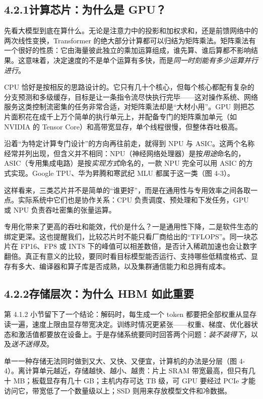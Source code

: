 \subsection*{4.2.1\quad 计算芯片：为什么是 GPU？}

先看大模型到底在算什么。无论是注意力中的投影和加权求和，还是前馈网络中的两次线性变换，Transformer 的绝大部分计算都可以归结为矩阵乘法。矩阵乘法有一个很好的性质：它由海量彼此独立的乘加运算组成，谁先算、谁后算都不影响结果。这意味着，决定速度的不是单个运算有多快，而是\emph{同一时刻能有多少运算并行进行}。

CPU 恰好是按相反的思路设计的。它只有几十个核心，但每个核心都配有复杂的分支预测和多级缓存，目标是让一条指令流尽快执行完毕——这对操作系统、网络服务这类控制流密集的任务非常合适，对矩阵乘法却是“大材小用”。GPU 则把芯片面积花在成千上万个简单的执行单元上，并配备专门的矩阵乘加单元（如 NVIDIA 的 Tensor Core）和高带宽显存，单个线程很慢，但整体吞吐极高。

沿着“为特定计算专门设计”的方向再往前走，就得到 NPU 与 ASIC。这两个名称经常并列出现，但含义并不相同：NPU（神经网络处理器）是按\emph{用途}命名的，ASIC（专用集成电路）是按\emph{实现方式}命名的，一款 NPU 完全可以用 ASIC 的方式实现。Google TPU、华为昇腾和寒武纪 MLU 都属于这一类（图 4-3）。

这样看来，三类芯片并不是简单的“谁更好”，而是在通用性与专用效率之间各取一点。实际系统中它们也是协作关系：CPU 负责调度、预处理和下发任务，GPU 或 NPU 负责吞吐密集的张量运算。

专用化带来了更高的吞吐和能效，代价是什么？一是通用性下降，二是软件生态的绑定更深。这也提醒我们，比较芯片时不能只看厂商给出的“TFLOPS”。同一块芯片在 FP16、FP8 或 INT8 下的峰值可以相差数倍，是否计入稀疏加速也会让数字翻倍。真正有意义的比较，要同时看目标模型能否运行、支持哪些低精度格式、显存有多大、编译器和算子库是否成熟，以及集群通信能力和总拥有成本。

\subsection*{4.2.2\quad 存储层次：为什么 HBM 如此重要}

第 4.1.2 小节留下了一个结论：解码时，每生成一个 token 都要把全部权重从显存读一遍，速度上限由显存带宽决定。训练时情况更紧张——权重、梯度、优化器状态和激活值都要放在设备上。于是存储系统要同时回答两个问题：\emph{装不装得下}，以及\emph{送不送得及}。

单一一种存储无法同时做到又大、又快、又便宜，计算机的办法是分层（图 4-4）。离计算单元越近，存储越快、越小、越贵：片上 SRAM 带宽最高，但只有几十 MB；板载显存有几十 GB；主机内存可达 TB 级，可 GPU 要经过 PCIe 才能访问它，带宽低了一个数量级以上；SSD 则用来存放模型文件和冷数据。

